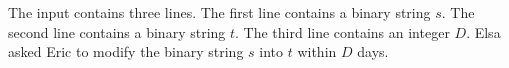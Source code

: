 The input contains three lines.
The first line contains a binary string $s$.
The second line contains a binary string $t$.
The third line contains an integer $D$.
Elsa asked Eric to modify the binary string $s$ into $t$ within $D$ days.
